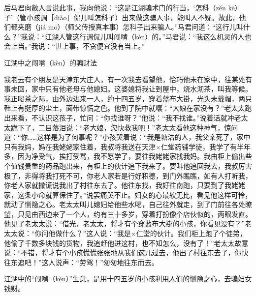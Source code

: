 \documentclass[12pt,UTF8]{ctexbook}
\begin{document}
后马君向敝人言说此事，我向他说：“这是江湖骗术门的行当，‘怎科（zěn kē）子’（管小孩调［diào］侃儿叫怎科子）出来做这骗人事，能叫人不疑。故此，他们都夹磨（jiá mo）（师父传授真本事）怎科子出来骗人。”马君问道：“这行儿叫什么？”我说：“江湖人管这行调侃儿叫闯啃（kèn）的。”马君说：“我这么机灵的人也会上当。”我说：“世上事，不贪便宜没有当上。”





江湖中之闯啃（kèn）的骗财法


我老云有个朋友是天津东大庄人，有一次我去看望他，恰巧他未在家中，往某处有事未回，家中只有他老母与他媳妇。这婆媳将我让到屋中，烧水沏茶，叫我等候。我正喝茶之际，由外边进来一人，约十四五岁，穿着蓝布大褂，光头未戴帽，两只鞋上有挺厚的尘土，面带惊慌之色。他到了院中就嚷：“大娘在家没有？”老太太跑出来看，不认识这孩子，忙问：“你找谁呀？”他说：“我不找谁。”说着话就冲老太太跪下了，二目落泪说：“老大娘，您快救我吧！”老太太看他这种神气，惊问道：“你……这样是为了何事呢？”小孩哭着说：“我是塘沽的人，我父亲死了，家中只有我妈，妈在我姥姥家住着，我叔将我送在天津×仁堂药铺学徒，我学了有半年多，因为净受气，挨打受骂，我不愿学了，要往我姥姥家找我妈。我由柜上偷出些个值钱贵重的药品跑出来，有柜上的伙计追下我来了。要叫他追回我去，我叔厉害极了，非得将我打死不可，你老人家若是行好积德，到门外瞧瞧，如有人打听我，你老人家就撒谎说我出了村往东去了。他往东找，我好往南跑，只要到了我姥姥家，这条小命就算保住了。”说罢痛哭不止。妇女的心最软无比，看见他这样可怜，就动了恻隐之心。老太太叫儿媳妇给他些水喝，自己往外就走，到了门前往各处瞭望，只见由西边来了一个人，约有三十多岁，穿着打扮像个店伙似的，两眼发直。他见了老太太说：“借光，老太太，将才有个穿蓝布大褂的小孩，你看见没有？”老太太说：“你问他做什么？”这人说：“我是×仁堂的伙计。我们柜上跑了个徒弟，他偷了千数多块钱的货物，我追赶他进这村，也不知怎么，没有了！”老太太故意说：“不错，将才有个小孩慌慌张张地从我们这儿过去，他出了村往东去了，你快往东追吧！”这人说声：“劳驾！”匆匆地往东而去。

江湖中的“闯啃（kèn）”生意，是用十四五岁的小孩利用人们的恻隐之心，去骗妇女钱财。
\end{document}
